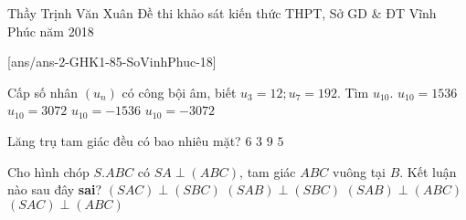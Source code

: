 \begin{name}
{Thầy Trịnh Văn Xuân}
{Đề thi khảo sát kiến thức THPT, Sở GD \& ĐT Vĩnh Phúc năm 2018}
\end{name}
\setcounter{ex}{0}\setcounter{bt}{0}
[ans/ans-2-GHK1-85-SoVinhPhuc-18]
\begin{ex}%
	Cấp số nhân $(u_n)$ có công bội âm, biết $u_3 =12; u_7 =192$. Tìm $u_{10}$.
	\choice
	{$u_{10}=1536$}
	{$u_{10}=3072$}
	{\True $u_{10}=-1536$}
	{$u_{10}=-3072$}
\end{ex}

\begin{ex}%
	Lăng trụ tam giác đều có bao nhiêu mặt?
	\choice
	{$6$}
	{$3$}
	{$9$}
	{\True $5$}
\end{ex}

\begin{ex}%
	Cho hình chóp $S.ABC$	có $SA\perp (ABC)$, tam giác $ABC$ vuông tại $B$. Kết luận nào sau đây \textbf{sai}?
	\choice
	{\True $(SAC)\perp (SBC)$}
	{$(SAB)\perp (SBC)$}
	{$(SAB)\perp (ABC)$}
	{$(SAC)\perp (ABC)$}
\end{ex}

